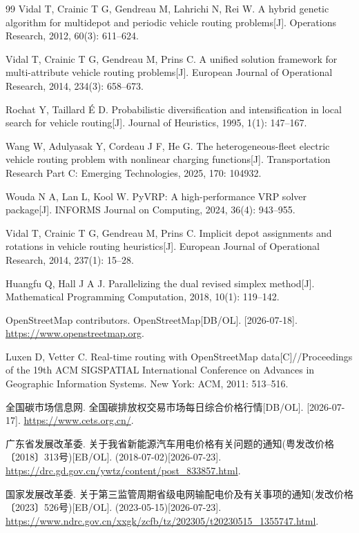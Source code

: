 \documentclass{setp-new}
\begin{document}
\begin{thebibliography}{99}
 Vidal T, Crainic T G, Gendreau M, Lahrichi N, Rei W. A hybrid genetic algorithm for multidepot and periodic vehicle routing problems[J]. Operations Research, 2012, 60(3): 611--624.

 Vidal T, Crainic T G, Gendreau M, Prins C. A unified solution framework for multi-attribute vehicle routing problems[J]. European Journal of Operational Research, 2014, 234(3): 658--673.

 Rochat Y, Taillard \'E D. Probabilistic diversification and intensification in local search for vehicle routing[J]. Journal of Heuristics, 1995, 1(1): 147--167.

 Wang W, Adulyasak Y, Cordeau J F, He G. The heterogeneous-fleet electric vehicle routing problem with nonlinear charging functions[J]. Transportation Research Part C: Emerging Technologies, 2025, 170: 104932.

 Wouda N A, Lan L, Kool W. PyVRP: A high-performance VRP solver package[J]. INFORMS Journal on Computing, 2024, 36(4): 943--955.

 Vidal T, Crainic T G, Gendreau M, Prins C. Implicit depot assignments and rotations in vehicle routing heuristics[J]. European Journal of Operational Research, 2014, 237(1): 15--28.

 Huangfu Q, Hall J A J. Parallelizing the dual revised simplex method[J]. Mathematical Programming Computation, 2018, 10(1): 119--142.

 OpenStreetMap contributors. OpenStreetMap[DB/OL]. [2026-07-18]. \url{https://www.openstreetmap.org}.

 Luxen D, Vetter C. Real-time routing with OpenStreetMap data[C]//Proceedings of the 19th ACM SIGSPATIAL International Conference on Advances in Geographic Information Systems. New York: ACM, 2011: 513--516.

 全国碳市场信息网. 全国碳排放权交易市场每日综合价格行情[DB/OL]. [2026-07-17]. \url{https://www.cets.org.cn/}.

 广东省发展改革委. 关于我省新能源汽车用电价格有关问题的通知(粤发改价格〔2018〕313号)[EB/OL]. (2018-07-02)[2026-07-23].
\url{https://drc.gd.gov.cn/ywtz/content/post_833857.html}.

 国家发展改革委. 关于第三监管周期省级电网输配电价及有关事项的通知(发改价格〔2023〕526号)[EB/OL]. (2023-05-15)[2026-07-23].
\url{https://www.ndrc.gov.cn/xxgk/zcfb/tz/202305/t20230515_1355747.html}.


\end{thebibliography}
\end{document}
